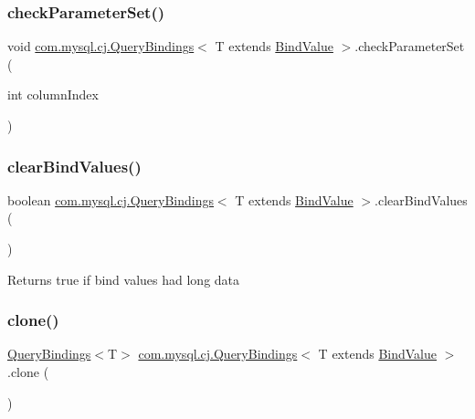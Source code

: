 \subsubsection{\texorpdfstring{check\+Parameter\+Set()}{checkParameterSet()}}
{\footnotesize\ttfamily void \mbox{\hyperlink{interfacecom_1_1mysql_1_1cj_1_1_query_bindings}{com.\+mysql.\+cj.\+Query\+Bindings}}$<$ T extends \mbox{\hyperlink{interfacecom_1_1mysql_1_1cj_1_1_bind_value}{Bind\+Value}} $>$.check\+Parameter\+Set (\begin{DoxyParamCaption}\item[{int}]{column\+Index }\end{DoxyParamCaption})}

\mbox{\label{interfacecom_1_1mysql_1_1cj_1_1_query_bindings_acd90572938fcce89fe68b9a3ba120372}} 
\subsubsection{\texorpdfstring{clear\+Bind\+Values()}{clearBindValues()}}
{\footnotesize\ttfamily boolean \mbox{\hyperlink{interfacecom_1_1mysql_1_1cj_1_1_query_bindings}{com.\+mysql.\+cj.\+Query\+Bindings}}$<$ T extends \mbox{\hyperlink{interfacecom_1_1mysql_1_1cj_1_1_bind_value}{Bind\+Value}} $>$.clear\+Bind\+Values (\begin{DoxyParamCaption}{ }\end{DoxyParamCaption})}

\begin{DoxyReturn}{Returns}
true if bind values had long data 
\end{DoxyReturn}
\mbox{\label{interfacecom_1_1mysql_1_1cj_1_1_query_bindings_af95c1b74f5f636e02f47609fdbd58b05}} 
\subsubsection{\texorpdfstring{clone()}{clone()}}
{\footnotesize\ttfamily \mbox{\hyperlink{interfacecom_1_1mysql_1_1cj_1_1_query_bindings}{Query\+Bindings}}$<$T$>$ \mbox{\hyperlink{interfacecom_1_1mysql_1_1cj_1_1_query_bindings}{com.\+mysql.\+cj.\+Query\+Bindings}}$<$ T extends \mbox{\hyperlink{interfacecom_1_1mysql_1_1cj_1_1_bind_value}{Bind\+Value}} $>$.clone (\begin{DoxyParamCaption}{ }\end{DoxyParamCaption})}

